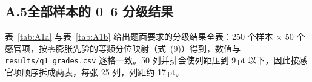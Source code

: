 \clearpage
\subsection*{A.5\quad 全部样本的 0--6 分级结果}

表~\ref{tab:A1a} 与表~\ref{tab:A1b} 给出题面要求的分级结果全表：250 个样本 $\times$ 50 个感官项，按零膨胀先验的等频分位映射（式~(9)）得到，数值与 \texttt{results/q1\_grades.csv} 逐格一致。50 列并排会使列距压到 9\,pt 以下，因此按感官项顺序拆成两表，每张 25 列，列距约 17\,pt。

\begingroup
\scriptsize
\setlength{\tabcolsep}{2.0pt}
\renewcommand{\arraystretch}{1.04}
